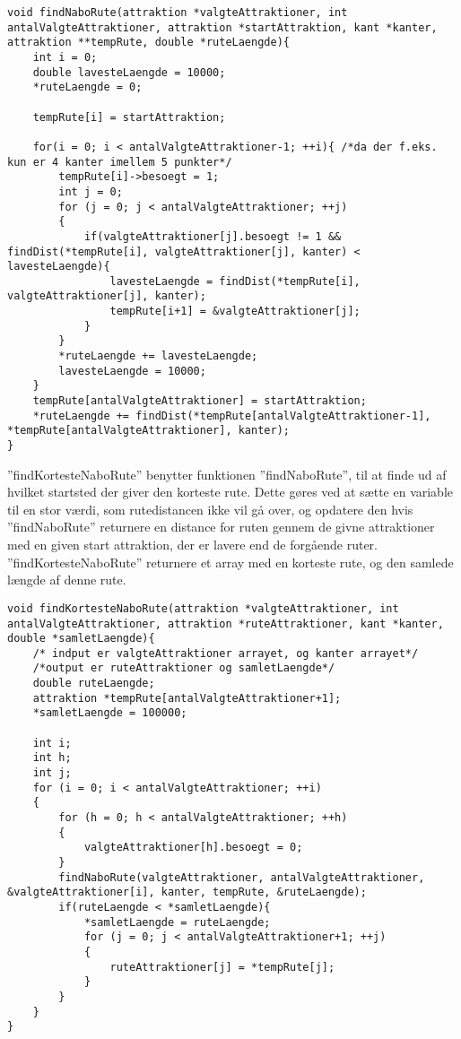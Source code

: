 \begin{lstlisting}
void findNaboRute(attraktion *valgteAttraktioner, int antalValgteAttraktioner, attraktion *startAttraktion, kant *kanter, attraktion **tempRute, double *ruteLaengde){
	int i = 0;
	double lavesteLaengde = 10000;
	*ruteLaengde = 0;

	tempRute[i] = startAttraktion;

	for(i = 0; i < antalValgteAttraktioner-1; ++i){ /*da der f.eks. kun er 4 kanter imellem 5 punkter*/
		tempRute[i]->besoegt = 1;
		int j = 0;
		for (j = 0; j < antalValgteAttraktioner; ++j)
		{
			if(valgteAttraktioner[j].besoegt != 1 && findDist(*tempRute[i], valgteAttraktioner[j], kanter) < lavesteLaengde){
				lavesteLaengde = findDist(*tempRute[i], valgteAttraktioner[j], kanter);
				tempRute[i+1] = &valgteAttraktioner[j];
			}
		}
		*ruteLaengde += lavesteLaengde;
		lavesteLaengde = 10000;
	}
	tempRute[antalValgteAttraktioner] = startAttraktion;
	*ruteLaengde += findDist(*tempRute[antalValgteAttraktioner-1], *tempRute[antalValgteAttraktioner], kanter);
}
\end{lstlisting}

”findKortesteNaboRute” benytter funktionen ”findNaboRute”, til at finde ud af hvilket startsted der giver den korteste rute. Dette gøres ved at sætte en variable til en stor værdi, som rutedistancen ikke vil gå over, og opdatere den hvis ”findNaboRute” returnere en distance for ruten gennem de givne attraktioner med en given start attraktion, der er lavere end de forgående ruter. ”findKortesteNaboRute” returnere et array med en korteste rute, og den samlede længde af denne rute.  \newline

\begin{lstlisting}
void findKortesteNaboRute(attraktion *valgteAttraktioner, int antalValgteAttraktioner, attraktion *ruteAttraktioner, kant *kanter, double *samletLaengde){
	/* indput er valgteAttraktioner arrayet, og kanter arrayet*/
	/*output er ruteAttraktioner og samletLaengde*/
	double ruteLaengde;
	attraktion *tempRute[antalValgteAttraktioner+1];
	*samletLaengde = 100000;
	
	int i;
	int h;
	int j;
	for (i = 0; i < antalValgteAttraktioner; ++i)
	{
		for (h = 0; h < antalValgteAttraktioner; ++h)
		{
			valgteAttraktioner[h].besoegt = 0;
		}
		findNaboRute(valgteAttraktioner, antalValgteAttraktioner, &valgteAttraktioner[i], kanter, tempRute, &ruteLaengde);
		if(ruteLaengde < *samletLaengde){
			*samletLaengde = ruteLaengde;
			for (j = 0; j < antalValgteAttraktioner+1; ++j)
			{
				ruteAttraktioner[j] = *tempRute[j];
			}
		}
	}
}
\end{lstlisting}

